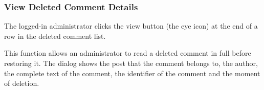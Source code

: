 
\subsubsection{View Deleted Comment Details}

 The logged-in administrator clicks the view button (the eye icon) at the end of a row in the deleted comment list.

 This function allows an administrator to read a deleted comment in full before restoring it. The dialog shows the post that the comment belongs to, the author, the complete text of the comment, the identifier of the comment and the moment of deletion.


